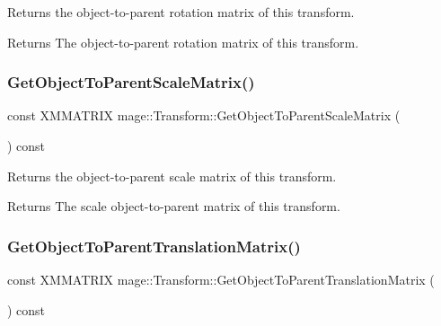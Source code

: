 Returns the object-\/to-\/parent rotation matrix of this transform.

\begin{DoxyReturn}{Returns}
The object-\/to-\/parent rotation matrix of this transform. 
\end{DoxyReturn}
\hypertarget{classmage_1_1_transform_a27c7ed867751be11143d6eb9b0578d52}{}\label{classmage_1_1_transform_a27c7ed867751be11143d6eb9b0578d52} 
\subsubsection{\texorpdfstring{Get\+Object\+To\+Parent\+Scale\+Matrix()}{GetObjectToParentScaleMatrix()}}
{\footnotesize\ttfamily const X\+M\+M\+A\+T\+R\+IX mage\+::\+Transform\+::\+Get\+Object\+To\+Parent\+Scale\+Matrix (\begin{DoxyParamCaption}{ }\end{DoxyParamCaption}) const\hspace{0.3cm}{\ttfamily [noexcept]}}

Returns the object-\/to-\/parent scale matrix of this transform.

\begin{DoxyReturn}{Returns}
The scale object-\/to-\/parent matrix of this transform. 
\end{DoxyReturn}
\hypertarget{classmage_1_1_transform_a7f9b6ae60fde68f06e3e57e2180af89c}{}\label{classmage_1_1_transform_a7f9b6ae60fde68f06e3e57e2180af89c} 
\subsubsection{\texorpdfstring{Get\+Object\+To\+Parent\+Translation\+Matrix()}{GetObjectToParentTranslationMatrix()}}
{\footnotesize\ttfamily const X\+M\+M\+A\+T\+R\+IX mage\+::\+Transform\+::\+Get\+Object\+To\+Parent\+Translation\+Matrix (\begin{DoxyParamCaption}{ }\end{DoxyParamCaption}) const\hspace{0.3cm}{\ttfamily [noexcept]}}

